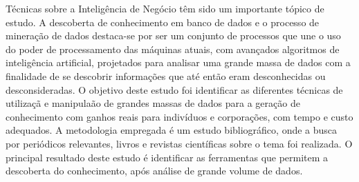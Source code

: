 
\begin{resumo}

T\'{e}cnicas sobre a Intelig\^{e}ncia de Neg\'{o}cio t\^{e}m sido um importante t\'{o}pico de estudo. A descoberta de conhecimento em banco de dados e o processo de mineração de dados destaca-se por ser um conjunto de processos que une o uso do poder de processamento das m\'{a}quinas atuais, com avan\c{c}ados algoritmos de intelig\^{e}ncia artificial, projetados para analisar uma grande massa de dados com a finalidade de se descobrir informa\c{c}\~{o}es que at\'{e} ent\~{a}o eram desconhecidas ou desconsideradas. O objetivo deste estudo foi identificar as diferentes t\'{e}cnicas de utiliza\c{c}\~{a} e manipula\~{a}o de grandes massas de dados para a gera\c{c}\~{a}o de conhecimento com ganhos reais para indiv\'{i}duos e corpora\c{c}\~{o}es, com tempo e custo adequados. A metodologia empregada \'{e} um estudo bibliogr\'{a}fico, onde a busca por peri\'{o}dicos relevantes, livros e revistas cient\'{i}ficas sobre o tema foi realizada. O principal resultado deste estudo \'{e} identificar as ferramentas que permitem a descoberta do conhecimento, ap\'{o}s an\'{a}lise de grande volume de dados.

\end{resumo}

